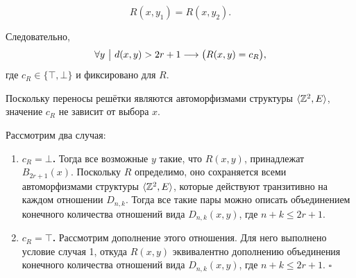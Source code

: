 $$
R(x,y_1)=R(x,y_2).
$$

Следовательно, $$\forall y\ \bigl|\ \Gdist(x,y)>2r+1 \then \bigl(R(x,y)=c_R\bigr),$$ где $c_R \in \{\top, \bot\}$ и фиксировано для $R$.

Поскольку переносы решётки являются автоморфизмами структуры $\langle\mathbb{Z}^2,E\rangle$, значение $c_R$ не зависит от выбора $x$.

Рассмотрим два случая: 
\begin{enumerate}
    \item \textbf{$c_R=\bot$.} Тогда все возможные $y$ такие, что $R(x,y)$, принадлежат $B_{2r+1}(x)$. Поскольку $R$ определимо, оно сохраняется всеми автоморфизмами структуры $\langle\mathbb{Z}^2,E\rangle$, которые действуют транзитивно на каждом отношении $D_{n,k}$. Тогда все такие пары можно описать объединением конечного количества отношений вида $D_{n, k}(x,y)$, где $n + k \le 2r+1$.
    \item \textbf{$c_R=\top$.} Рассмотрим дополнение этого отношения. Для него выполнено условие случая 1, откуда $R(x,y)$ эквивалентно дополнению объединения конечного количества отношений вида $D_{n, k}(x,y)$, где $n + k \le 2r+1$. \hfill $\square$
\end{enumerate}
